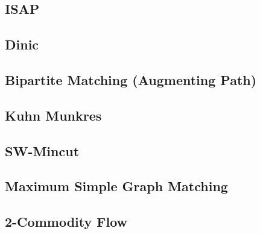 \documentclass[10pt,twocolumn,oneside]{article}
\begin{document}
\subsection{ISAP} %


\subsection{Dinic} %


\subsection{Bipartite Matching (Augmenting Path)}


\subsection{Kuhn Munkres}


\subsection{SW-Mincut}


\subsection{Maximum Simple Graph Matching}


%


\subsection{2-Commodity Flow}


%
\end{document}
